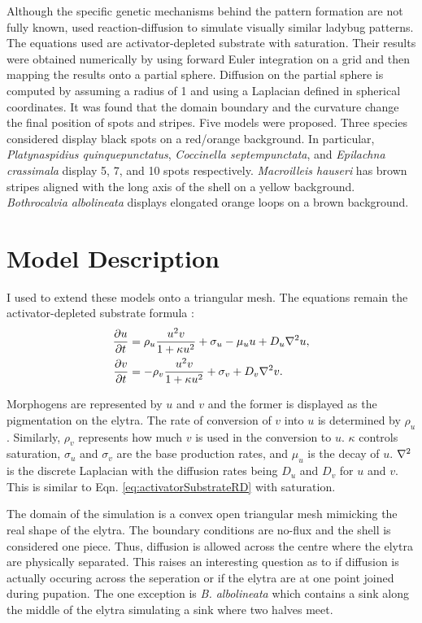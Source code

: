 Although the specific genetic mechanisms behind the pattern formation are not fully known, \citet{Liaw2001} used reaction-diffusion to simulate visually similar ladybug patterns. The equations used are activator-depleted substrate with saturation. Their results were obtained numerically by using forward Euler integration on a grid and then mapping the results onto a partial sphere. Diffusion on the partial sphere is computed by assuming a radius of 1 and using a Laplacian defined in spherical coordinates. It was found that the domain boundary and the curvature change the final position of spots and stripes. Five models were proposed. Three species considered display black spots on a red/orange background. In particular, \textit{Platynaspidius quinquepunctatus}, \textit{Coccinella septempunctata}, and \textit{Epilachna crassimala} display 5, 7, and 10 spots respectively. \textit{Macroilleis hauseri} has brown stripes aligned with the long axis of the shell on a yellow background. \textit{Bothrocalvia albolineata} displays elongated orange loops on a brown background.

\section{Model Description} 
I used \ProgramName{} to extend these models onto a triangular mesh. The equations remain the activator-depleted substrate formula \citep{Meinhardt1982}:
\begin{equation}
	\begin{aligned} \label{eq:ladybugRD}
   \frac{\partial u}{\partial t} &= \rho_u \frac{u^2v}{1+\kappa u^2} + \sigma_u - \mu_u u + D_u \nabla^2 u, \\
   \frac{\partial v}{\partial t} &= -\rho_v \frac{u^2v}{1+\kappa u^2} + \sigma_v + D_v \nabla^2 v.
	\end{aligned}
\end{equation}

Morphogens are represented by $u$ and $v$ and the former is displayed as the pigmentation on the elytra. The rate of conversion of $v$ into $u$ is determined by $\rho_u$. Similarly, $\rho_v$ represents how much $v$ is used in the conversion to $u$. $\kappa$ controls saturation, $\sigma_u$ and $\sigma_v$ are the base production rates, and $\mu_u$ is the decay of $u$. $\nabla^2$ is the discrete Laplacian with the diffusion rates being $D_u$ and $D_v$ for $u$ and $v$. This is similar to Eqn. \ref{eq:activatorSubstrateRD} with saturation.

The domain of the simulation is a convex open triangular mesh mimicking the real shape of the elytra. The boundary conditions are no-flux and the shell is considered one piece. Thus, diffusion is allowed across the centre where the elytra are physically separated. This raises an interesting question as to if diffusion is actually occuring across the seperation or if the elytra are at one point joined during pupation. The one exception is \textit{B. albolineata} which contains a sink along the middle of the elytra simulating a sink where two halves meet.

